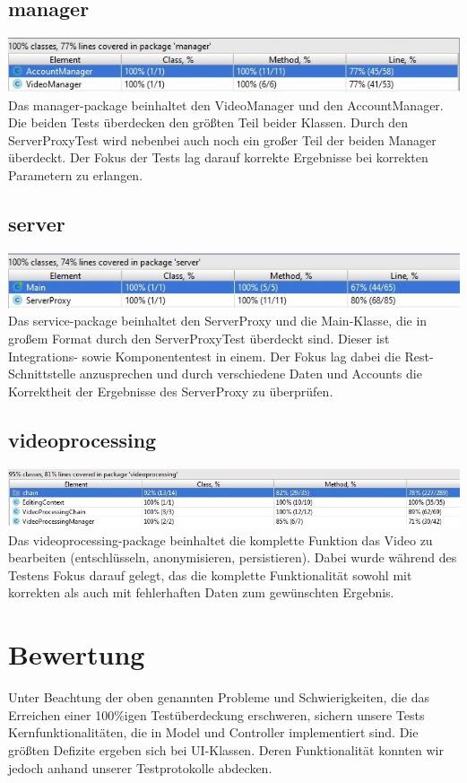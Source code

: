\subsection{manager}
\includegraphics[scale=0.8]{resources/manager.jpg}
Das manager-package beinhaltet den VideoManager und den AccountManager. Die beiden Tests überdecken den größten Teil beider Klassen. Durch den ServerProxyTest wird nebenbei auch noch ein großer Teil der beiden Manager überdeckt. Der Fokus der Tests lag darauf korrekte Ergebnisse bei korrekten Parametern zu erlangen.
\subsection{server}
\includegraphics[scale=0.81]{resources/server.jpg}
Das service-package beinhaltet den ServerProxy und die Main-Klasse, die in großem Format durch den ServerProxyTest überdeckt sind. Dieser ist Integrations- sowie Komponententest in einem. Der Fokus lag dabei die Rest-Schnittstelle anzusprechen und durch verschiedene Daten und Accounts die Korrektheit der Ergebnisse des ServerProxy zu überprüfen. 
\subsection{videoprocessing}
\includegraphics[scale=0.6]{resources/videoprocessing.jpg}
Das videoprocessing-package beinhaltet die komplette Funktion das Video zu bearbeiten (entschlüsseln, anonymisieren, persistieren). Dabei wurde während des Testens Fokus darauf gelegt, das die komplette Funktionalität sowohl mit korrekten als auch mit fehlerhaften Daten zum gewünschten Ergebnis. 

\section{Bewertung}
Unter Beachtung der oben genannten Probleme und Schwierigkeiten, die das Erreichen einer 100\%igen Testüberdeckung erschweren, sichern unsere Tests Kernfunktionalitäten, die in Model und Controller implementiert sind. Die größten Defizite ergeben sich bei UI-Klassen. Deren Funktionalität konnten wir jedoch anhand unserer Testprotokolle abdecken.
